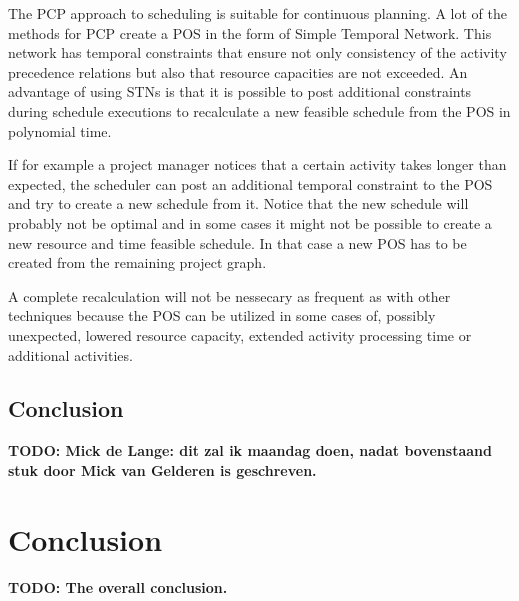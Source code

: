 \documentclass{article}
\newcommand{\TODO}[1]{{\color{red}\textbf{TODO: #1}}}
\begin{document}
The PCP approach to scheduling is suitable for continuous planning. A lot of the methods for PCP create a POS in the form of Simple Temporal Network. This network has temporal constraints that ensure not only consistency of the activity precedence relations but also that resource capacities are not exceeded. An advantage of using STNs is that it is possible to post additional constraints during schedule executions to recalculate a new feasible schedule from the POS in polynomial time. 

If for example a project manager notices that a certain activity takes longer than expected, the scheduler can post an additional temporal constraint to the POS and try to create a new schedule from it. Notice that the new schedule will probably not be optimal and in some cases it might not be possible to create a new resource and time feasible schedule. In that case a new POS has to be created from the remaining project graph. 

A complete recalculation will not be nessecary as frequent as with other techniques because the POS can be utilized in some cases of, possibly unexpected, lowered resource capacity, extended activity processing time or additional activities. 

\subsection{Conclusion}
\TODO{Mick de Lange: dit zal ik maandag doen, nadat bovenstaand stuk door Mick van Gelderen is geschreven.}



\section{Conclusion}
\TODO{The overall conclusion.}



\end{document}
